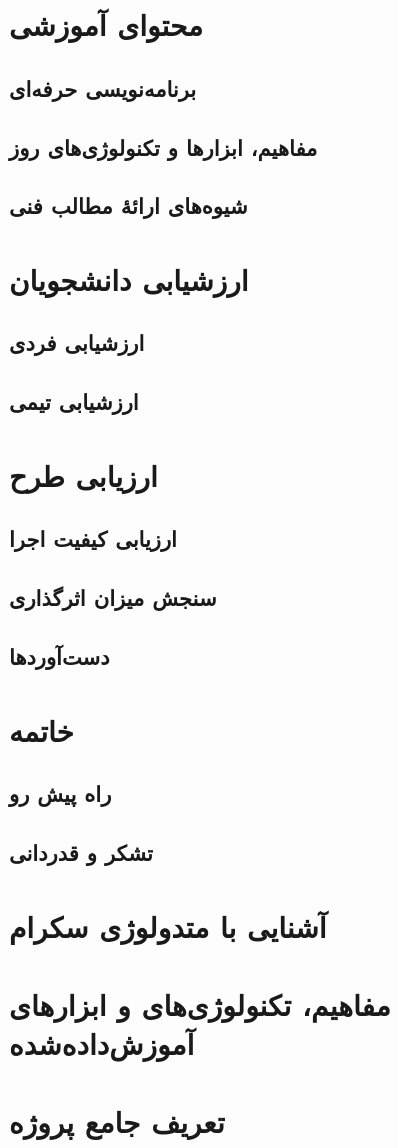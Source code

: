\documentclass[a4paper,notitlepage]{report}
\begin{document}
\chapter{محتوای آموزشی}
\section{برنامه‌نویسی حرفه‌ای}
\section{مفاهیم، ابزارها و تکنولوژی‌های روز}
\section{شیوه‌های ارائهٔ مطالب فنی}
\chapter{ارزشیابی دانشجویان}
\section{ارزشیابی فردی}
\section{ارزشیابی تیمی}
\chapter{ارزیابی طرح}
\section{ارزیابی کیفیت اجرا} 
\section{سنجش میزان اثرگذاری}
\section{دست‌آوردها}
\chapter{خاتمه}
\section{راه پیش رو}
\section{تشکر و قدردانی}
\appendix
\chapter{آشنایی با متدولوژی سکرام}
\chapter{مفاهیم، تکنولوژی‌های و ابزارهای آموزش‌داده‌شده}
\chapter{تعریف جامع پروژه}
\end{document}

